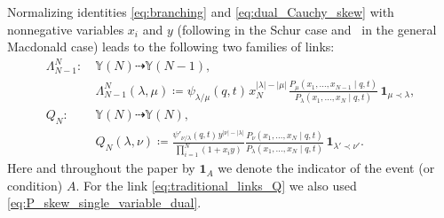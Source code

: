 Normalizing identities
\eqref{eq:branching} and \eqref{eq:dual_Cauchy_skew}
with nonnegative variables $x_i$ and $y$
(following
\cite{Borodin2010Schur,BorFerr2008DF} in the Schur case and~\cite{BorodinCorwin2011Macdonald}
in the general Macdonald case)
leads to the following two families of links:
\begin{align}
\Lambda^{N}_{N-1}\colon \ & \mathbb{Y}(N)\dashrightarrow \mathbb{Y}(N-1),
		\nonumber\\
		& \Lambda^{N}_{N-1}(\lambda,\mu)\coloneqq
		\psi_{\lambda/\mu}(q,t)\hspace{1pt} x_N^{|\lambda|-|\mu|}\hspace{1pt}
		\frac{
		P_\mu(x_1,\dots,x_{N-1} \mid q,t )
		}
		{P_\lambda(x_1,\dots,x_N \mid q,t)}
		\,\mathbf{1}_{\mu\prec\lambda},\label{eq:traditional_links_Lambda}\\
Q_N\colon \ & \mathbb{Y}(N)\dashrightarrow \mathbb{Y}(N),
		\nonumber\\
		& Q_N(\lambda,\nu)\coloneqq
		\frac{\psi'_{\nu/\lambda}(q,t)
		\hspace{1pt}
		y^{|\nu|-|\lambda|}
		}
		{\prod_{i=1}^{N}(1+x_i y)}
		\frac
		{
		P_\nu(x_1,\dots,x_N\mid q,t )}
		{P_\lambda(x_1,\dots,x_N\mid q,t )}
		\,\mathbf{1}_{\lambda'\prec\nu'}		.\label{eq:traditional_links_Q}
\end{align}
Here and
throughout the paper by $\mathbf{1}_{A}$ we denote
the indicator of the event (or condition) $A$.
For the link \eqref{eq:traditional_links_Q}
we also used \eqref{eq:P_skew_single_variable_dual}.
